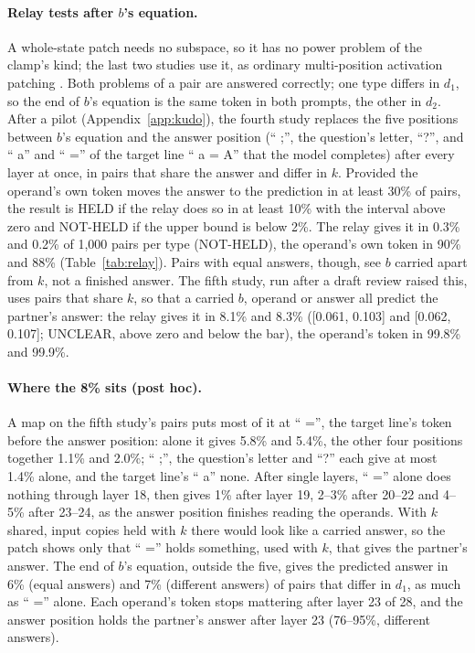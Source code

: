 \documentclass{article}
\begin{document}
\paragraph{Relay tests after $b$'s equation.} A whole-state patch needs no subspace, so it has no power problem of the clamp's kind; the last two studies use it, as ordinary multi-position activation patching \citep{meng2022locating,zhang2024patching}. Both problems of a pair are answered correctly; one type differs in $d_1$, so the end of $b$'s equation is the same token in both prompts, the other in $d_2$. After a pilot (Appendix~\ref{app:kudo}), the fourth study replaces the five positions between $b$'s equation and the answer position (`` ;'', the question's letter, ``?'', and `` a'' and `` ='' of the target line `` a = A'' that the model completes) after every layer at once, in pairs that share the answer and differ in $k$. Provided the operand's own token moves the answer to the prediction in at least 30\% of pairs, the result is HELD if the relay does so in at least 10\% with the interval above zero and NOT-HELD if the upper bound is below 2\%. The relay gives it in 0.3\% and 0.2\% of 1,000 pairs per type (NOT-HELD), the operand's own token in 90\% and 88\% (Table~\ref{tab:relay}). Pairs with equal answers, though, see $b$ carried apart from $k$, not a finished answer. The fifth study, run after a draft review raised this, uses pairs that share $k$, so that a carried $b$, operand or answer all predict the partner's answer: the relay gives it in 8.1\% and 8.3\% ([0.061, 0.103] and [0.062, 0.107]; UNCLEAR, above zero and below the bar), the operand's token in 99.8\% and 99.9\%.

\paragraph{Where the 8\% sits (post hoc).} A map on the fifth study's pairs puts most of it at `` ='', the target line's token before the answer position: alone it gives 5.8\% and 5.4\%, the other four positions together 1.1\% and 2.0\%; `` ;'', the question's letter and ``?'' each give at most 1.4\% alone, and the target line's `` a'' none. After single layers, `` ='' alone does nothing through layer 18, then gives 1\% after layer 19, 2--3\% after 20--22 and 4--5\% after 23--24, as the answer position finishes reading the operands. With $k$ shared, input copies held with $k$ there would look like a carried answer, so the patch shows only that `` ='' holds something, used with $k$, that gives the partner's answer. The end of $b$'s equation, outside the five, gives the predicted answer in 6\% (equal answers) and 7\% (different answers) of pairs that differ in $d_1$, as much as `` ='' alone. Each operand's token stops mattering after layer 23 of 28, and the answer position holds the partner's answer after layer 23 (76--95\%, different answers).
\end{document}

